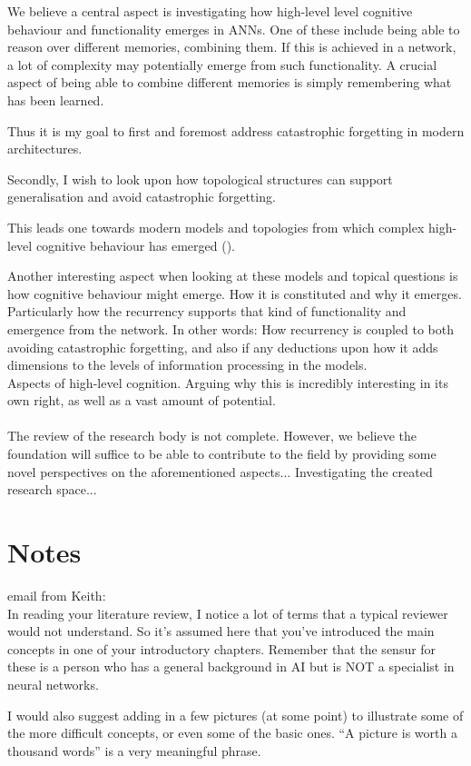 We believe a central aspect is investigating how high-level level cognitive behaviour and functionality emerges in ANNs.
One of these include being able to reason over different memories, combining them. If this is achieved in a network, a lot of complexity may potentially emerge from such functionality. A crucial aspect of being able to combine different memories is simply remembering what has been learned.

Thus it is my goal to first and foremost address catastrophic forgetting in modern architectures.

Secondly, I wish to look upon how topological structures can support generalisation and avoid catastrophic forgetting.

This leads one towards modern models and topologies from which complex high-level cognitive behaviour has emerged (\cite{Tani2014}).

Another interesting aspect when looking at these models and topical questions is how cognitive behaviour might emerge. How it is constituted and why it emerges. Particularly how the recurrency supports that kind of functionality and emergence from the network. In other words: How recurrency is coupled to both avoiding catastrophic forgetting, and also if any deductions upon how it adds dimensions to the levels of information processing in the models.
\\
Aspects of high-level cognition. Arguing why this is incredibly interesting in its own right, as well as a vast amount of potential.
\\\\
The review of the research body is not complete. However, we believe the foundation will suffice to be able to contribute to the field by providing some novel perspectives on the aforementioned aspects... Investigating the created research space...


\section{Notes}
email from Keith:
\\
  In reading your literature review, I notice a lot of terms that a typical reviewer would not understand.  So it’s assumed here that you’ve introduced the main concepts in one of your introductory chapters.  Remember that the
sensur for these is a person who has a general background in AI but is  NOT a specialist in neural networks.

  I would also suggest adding in a few pictures (at some point) to illustrate some of the more difficult concepts, or even some of the basic ones.  “A picture is worth a thousand words” is a very meaningful phrase.

\cleardoublepage